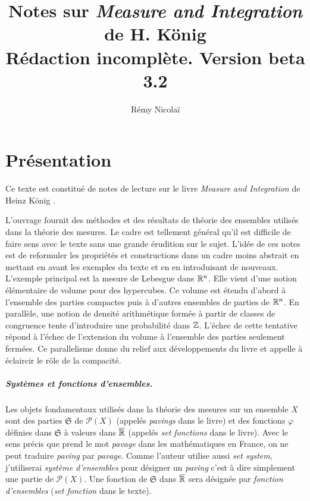 
\nocite{*}

\title{
         Notes sur \emph{Measure and Integration} de H. König \\
         \large Rédaction incomplète. Version  beta 3.2
      }
\author{Rémy Nicolaï}


\maketitle
\tableofcontents
\clearpage

\chapter{Présentation}
\noindent Ce texte est constitué de notes de lecture sur le livre \emph{Measure and Integration} de Heinz König \cite{könig1997measure}.

\noindent L'ouvrage fournit des méthodes et des résultats de théorie des ensembles utilisés dans la théorie des mesures. Le cadre est tellement général qu'il est difficile de faire sens avec le texte sans une grande érudition sur le sujet. L'idée de ces notes est de reformuler les propriétés et constructions dans un cadre moins abstrait en mettant en avant les exemples du texte et en en introduisant de nouveaux.\newline
L'exemple principal est la mesure de Lebesgue dans $\mathbb{R}^n$. Elle vient d'une notion élémentaire de volume pour des hypercubes. Ce volume est étendu d'abord à l'ensemble des parties compactes puis à d'autres ensembles de parties de $\mathbb{R}^n$.\newline
En parallèle, une notion de densité arithmétique formée à partir de classes de congruence tente d'introduire une probabilité dans $\mathbb{Z}$. L'échec de cette tentative répond à l'échec de l'extension du volume à l'ensemble des parties seulement fermées. Ce parallelisme donne du relief aux développements du livre et appelle à éclaircir le rôle de la compacité.

\paragraph*{Systèmes et fonctions d'ensembles.}
Les objets fondamentaux utilisés dans la théorie des mesures sur un ensemble $X$ sont des parties $\mathfrak{S}$ de $\mathcal{P}(X)$ (appelés \emph{pavings} dans le livre) et des fonctions $\varphi$ définies dans $\mathfrak{S}$ à valeurs dans $\overline{\mathbb{R}}$ (appelés \emph{set fonctions} dans le livre).\newline
Avec le sens précis que prend le mot \emph{pavage} dans les mathématiques en France, on ne peut traduire \emph{paving} par \emph{pavage}. Comme l'auteur utilise aussi \emph{set system}, j'utiliserai \emph{système d'ensembles} pour désigner un \emph{paving} c'est à dire simplement une partie de $\mathcal{P}(X)$.\newline
Une fonction de $\mathfrak{S}$ dans $\overline{\mathbb{R}}$ sera désignée par \emph{fonction d'ensembles} (\emph{set fonction} dans le texte).

